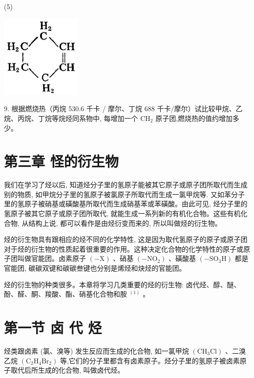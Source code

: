 \documentclass[10pt]{article}
\begin{document}
(5)

\begin{center}
\includegraphics[max width=0.3\textwidth]{images/01912d16-be99-77bb-9535-4f3ed8d9946f_108_803239.jpg}
\end{center}

9. 根据燃烧热（丙烷 530.6 千卡 / 摩尔、丁烷 688 千卡/摩尔）试比较甲烷、乙烷、丙烷、丁烷等烷烃同系物中, 每增加一个 \({\mathrm{{CH}}}_{2}\) 原子团,燃烧热的值约增加多少。

\section*{第三章 怪的衍生物}

我们在学习了烃以后, 知道烃分子里的氢原子能被其它原子或原子团所取代而生成别的物质, 如甲烷分子里的氢原子被氯原子所取代而生成一氯甲烷等. 又如苯分子里的氢原子被硝基或磺酸基所取代而生成硝基苯或苯磺酸。由此可见, 烃分子里的氢原子被其它原子或原子团所取代, 就能生成一系列新的有机化合物。这些有机化合物, 从结构上说, 都可以看作是由烃衍变而来的, 所以叫做烃的衍生物。

烃的衍生物具有跟相应的烃不同的化学特性, 这是因为取代氢原子的原子或原子团对于烃的衍生物的性质起着很重要的作用。这种决定化合物的化学特性的原子或原子团叫做官能团。卤素原子 \(\left( {-\mathrm{X}}\right)\) 、硝基 \(\left( {-{\mathrm{{NO}}}_{2}}\right)\) 、磺酸基 \(\left( {-{\mathrm{{SO}}}_{3}\mathrm{H}}\right)\) 都是官能团, 碳碳双键和碳碳叁键也分别是烯烃和炔烃的官能团。

烃的衍生物的种类很多。本章将学习几类重要的烃的衍生物: 卤代烃、醇、醚、酚、醛、酮、羧酸、酯、硝基化合物和胺 \({}^{\left( 1\right) }\) 。

\section*{第一节 卤 代 烃}

烃类跟卤素 (氯、溴等) 发生反应而生成的化合物, 如一氯甲烷 \(\left( {{\mathrm{{CH}}}_{3}\mathrm{{Cl}}}\right)\) 、二溴乙烷 \(\left( {{\mathrm{C}}_{2}{\mathrm{H}}_{4}{\mathrm{{Br}}}_{2}}\right)\) 等,它们的分子里都含有卤素原子。烃分子里的氢原子被卤素原子取代后所生成的化合物, 叫做卤代烃。
\end{document}
